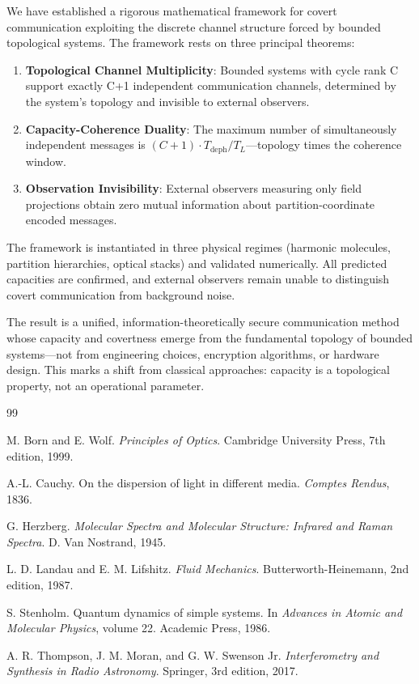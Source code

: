 \documentclass[11pt,twocolumn,a4paper]{article}
\theoremstyle{definition}
\begin{document}
We have established a rigorous mathematical framework for covert communication exploiting the discrete channel structure forced by bounded topological systems. The framework rests on three principal theorems:

\begin{enumerate}[nosep]
\item \textbf{Topological Channel Multiplicity}: Bounded systems with cycle rank C support exactly C+1 independent communication channels, determined by the system's topology and invisible to external observers.

\item \textbf{Capacity-Coherence Duality}: The maximum number of simultaneously independent messages is $(C+1) \cdot T_{\text{deph}}/T_L$—topology times the coherence window.

\item \textbf{Observation Invisibility}: External observers measuring only field projections obtain zero mutual information about partition-coordinate encoded messages.
\end{enumerate}

The framework is instantiated in three physical regimes (harmonic molecules, partition hierarchies, optical stacks) and validated numerically. All predicted capacities are confirmed, and external observers remain unable to distinguish covert communication from background noise.

The result is a unified, information-theoretically secure communication method whose capacity and covertness emerge from the fundamental topology of bounded systems—not from engineering choices, encryption algorithms, or hardware design. This marks a shift from classical approaches: capacity is a topological property, not an operational parameter.

\begin{thebibliography}{99}

 M. Born and E. Wolf. \emph{Principles of Optics}. Cambridge University Press, 7th edition, 1999.

 A.-L. Cauchy. On the dispersion of light in different media. \emph{Comptes Rendus}, 1836.

 G. Herzberg. \emph{Molecular Spectra and Molecular Structure: Infrared and Raman Spectra}. D. Van Nostrand, 1945.

 L. D. Landau and E. M. Lifshitz. \emph{Fluid Mechanics}. Butterworth-Heinemann, 2nd edition, 1987.

 S. Stenholm. Quantum dynamics of simple systems. In \emph{Advances in Atomic and Molecular Physics}, volume 22. Academic Press, 1986.

 A. R. Thompson, J. M. Moran, and G. W. Swenson Jr. \emph{Interferometry and Synthesis in Radio Astronomy}. Springer, 3rd edition, 2017.

\end{thebibliography}
\end{document}
